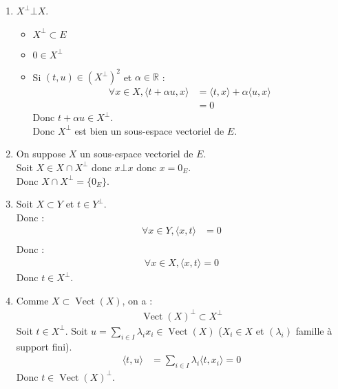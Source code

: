 \documentclass[../main.tex]{subfiles}
\begin{document}
\begin{enumerate}
    \item $X^\bot \bot X$. \\
    \begin{itemize}
        \item $X^\bot\subset E$
        \item $0\in X^\bot$
        \item Si $(t, u)\in (X^\bot)^2$ et $\alpha\in \mathbb{R}$ : 
        \begin{align*}
            \forall x\in X, \langle t + \alpha u, x\rangle &= \langle t, x\rangle + \alpha \langle u, x\rangle \\
            &= 0
        \end{align*}
        Donc $t + \alpha u\in X^\bot$. \\
        Donc $X^\bot$ est bien un sous-espace vectoriel de $E$. 
    \end{itemize}
    \item On suppose $X$ un sous-espace vectoriel de $E$. \\
    Soit $X\in X\cap X^\bot$ donc $x\bot x$ donc $x = 0_E$. \\
    Donc $X\cap X^\bot = \{0_E\}$. 
    \item Soit $X\subset Y$ et $t\in Y^\bot$. \\
    Donc : 
    \begin{align*}
        \forall x\in Y, \langle x, t\rangle &= 0 \\
    \end{align*}
    Donc : 
    \begin{align*}
        \forall x\in X, \langle x, t\rangle = 0
    \end{align*}
    Donc $t\in X^\bot$. 
    \item Comme $X\subset \operatorname{Vect}(X)$, on a : 
    \begin{align*}
        \operatorname{Vect}(X)^\bot \subset X^\bot
    \end{align*}
    Soit $t\in X^\bot$. Soit $u = \sum\limits_{i\in I} \lambda_i x_i\in \operatorname{Vect}(X)$ ($X_i\in X$ et $(\lambda_i)$ famille à support fini). 
    \begin{align*}
        \langle t, u \rangle &= \sum_{i\in I} \lambda_i \langle t, x_i\rangle = 0
    \end{align*}
    Donc $t\in \operatorname{Vect}(X)^\bot$.
\end{enumerate}
\end{document}
